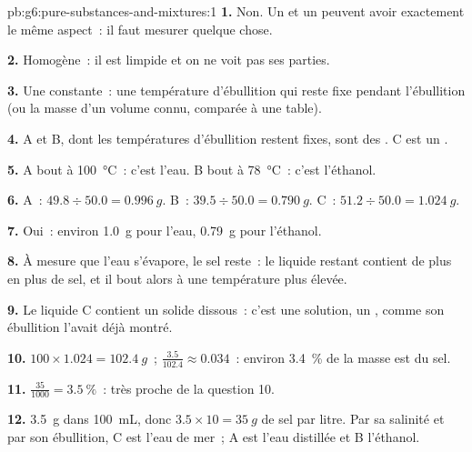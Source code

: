 \begin{solution}{pb:g6:pure-substances-and-mixtures:1}
\textbf{1.} Non. Un  et un  peuvent avoir
exactement le même aspect~: il faut mesurer quelque chose.

\textbf{2.} Homogène~: il est limpide et on ne voit pas ses parties.

\textbf{3.} Une constante~: une température d'ébullition qui reste fixe
pendant l'ébullition (ou la masse d'un volume connu, comparée à une
table).

\textbf{4.} A et B, dont les températures d'ébullition restent fixes,
sont des . C est un .

\textbf{5.} A bout à \qty{100}{\celsius}~: c'est l'eau. B bout à
\qty{78}{\celsius}~: c'est l'éthanol.

\textbf{6.} A~: $49.8 \div 50.0 = \qty{0.996}{g}$. B~: $39.5 \div 50.0 =
\qty{0.790}{g}$. C~: $51.2 \div 50.0 = \qty{1.024}{g}$.

\textbf{7.} Oui~: environ \qty{1.0}{g} pour l'eau, \qty{0.79}{g} pour
l'éthanol.

\textbf{8.} À mesure que l'eau s'évapore, le sel reste~: le liquide
restant contient de plus en plus de sel, et il bout alors à une
température plus élevée.

\textbf{9.} Le liquide C contient un solide dissous~: c'est une
solution, un , comme son ébullition l'avait déjà montré.

\textbf{10.} $100 \times 1.024 = \qty{102.4}{g}$~; $\frac{3.5}{102.4}
\approx 0.034$~: environ \qty{3.4}{\percent} de la masse est du sel.

\textbf{11.} $\frac{35}{1000} = \qty{3.5}{\percent}$~: très proche de la
question 10.

\textbf{12.} \qty{3.5}{g} dans \qty{100}{mL}, donc $3.5 \times 10 =
\qty{35}{g}$ de sel par litre. Par sa salinité et par son ébullition, C
est l'eau de mer~; A est l'eau distillée et B l'éthanol.
\end{solution}
